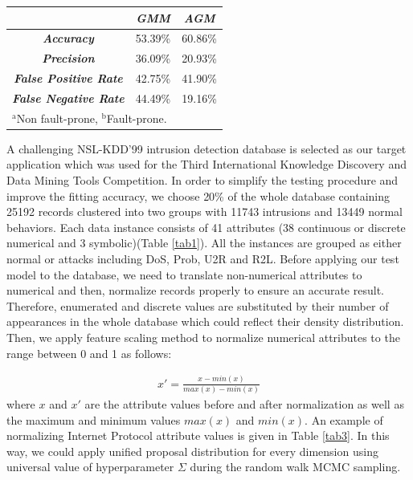 \documentclass[conference]{IEEEtran}
\begin{document}
\begin{table}[b]
\begin{center}
\begin{tabular}{|c|c|c|}
\hline
 & \multicolumn{1}{|p{1.5cm}|}{\centering \textbf{\textit{GMM}}} & \multicolumn{1}{|p{1.5cm}|}{\centering \textbf{\textit{AGM}}}\\
\hline
\multicolumn{1}{|p{2.5cm}|}{\centering \textbf{\textit{Accuracy}}}  & 53.39\% & 60.86\%\\
\multicolumn{1}{|p{2.5cm}|}{\centering \textbf{\textit{Precision}}} & 36.09\% & 20.93\%\\
\multicolumn{1}{|p{2.5cm}|}{\centering \textbf{\textit{False Positive Rate}}}  & 42.75\% & 41.90\%\\
\multicolumn{1}{|p{2.5cm}|}{\centering \textbf{\textit{False Negative Rate}}} & 44.49\% & 19.16\%\\
\hline
\multicolumn{3}{l}{$^{\mathrm{a}}$Non fault-prone, $^{\mathrm{b}}$Fault-prone.}
\end{tabular}
\end{center}
\label{tab5}
\end{table}

A challenging NSL-KDD'99 intrusion detection database\cite{Tavallaee2009} is selected as our target application which was used for the Third International Knowledge Discovery and Data Mining Tools Competition. In order to simplify the testing procedure and improve the fitting accuracy, we choose 20\% of the whole database containing 25192 records clustered into two groups with 11743 intrusions and 13449 normal behaviors. Each data instance consists of 41 attributes (38 continuous or discrete numerical and 3 symbolic)(Table \ref{tab1}). All the instances are grouped as either normal or attacks including DoS, Prob, U2R and R2L. Before applying our test model to the database, we need to translate non-numerical attributes to numerical and then, normalize records properly to ensure an accurate result. Therefore, enumerated and discrete values are substituted by their number of appearances in the whole database which could reflect their density distribution. Then, we apply feature scaling method to normalize numerical attributes to the range between 0 and 1 as follows: 

\begin{align}
x' = \frac{x - min(x)}{max(x) - min(x)}
\label{eq:normalize}
\end{align}
where $x$ and $x'$ are the attribute values before and after normalization as well as the maximum and minimum values $max(x)$  and $min(x)$. An example of normalizing Internet Protocol attribute values is given in Table \ref{tab3}. In this way, we could apply unified proposal distribution for every dimension using universal value of hyperparameter $\Sigma$ during the random walk MCMC sampling.
\end{document}
